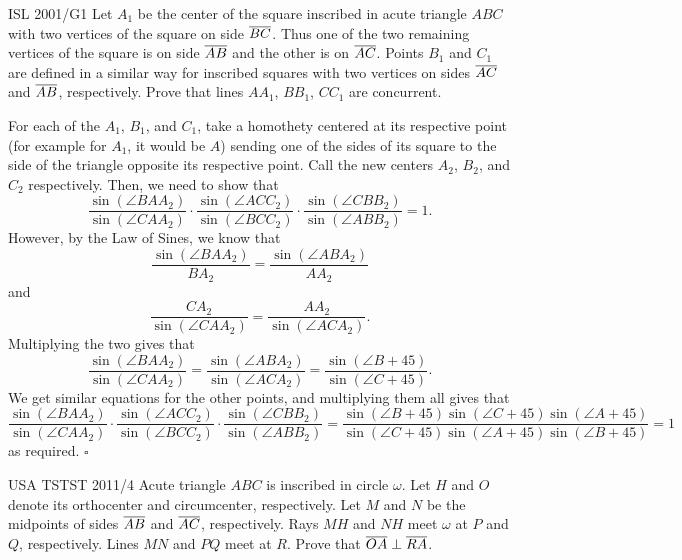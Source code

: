 \documentclass{article}
\begin{document}
\begin{problem}[3.28]{ISL 2001/G1}
Let $A_1$ be the center of the square inscribed in acute triangle $ABC$ with two vertices of the square on side $\overline{BC}$. Thus one of the two remaining vertices of the square is on side $\overline{AB}$ and the other is on $\overline{AC}$. Points $B_1$ and $C_1$ are defined in a similar way for inscribed squares with two vertices on sides $\overline{AC}$ and $\overline{AB}$, respectively. Prove that lines $AA_1$, $BB_1$, $CC_1$ are concurrent.
\end{problem}

For each of the $A_1$, $B_1$, and $C_1$, take a homothety centered at its respective point (for example for $A_1$, it would be $A$) sending one of the sides of its square to the side of the triangle opposite its respective point. Call the new centers $A_2$, $B_2$, and $C_2$ respectively. Then, we need to show that \[\dfrac{\sin(\angle BAA_2)}{\sin(\angle CAA_2)}\cdot\dfrac{\sin(\angle ACC_2)}{\sin(\angle BCC_2)}\cdot\dfrac{\sin(\angle CBB_2)}{\sin(\angle ABB_2)} = 1.\] However, by the Law of Sines, we know that \[\dfrac{\sin(\angle BAA_2)}{BA_2} = \dfrac{\sin(\angle ABA_2)}{AA_2}\] and \[\dfrac{CA_2}{\sin(\angle CAA_2)} = \dfrac{AA_2}{\sin(\angle ACA_2)}.\] Multiplying the two gives that \[\dfrac{\sin(\angle BAA_2)}{\sin(\angle CAA_2)} = \dfrac{\sin(\angle ABA_2)}{\sin(\angle ACA_2)} = \dfrac{\sin(\angle B+45)}{\sin(\angle C+45)}.\] We get similar equations for the other points, and multiplying them all gives that \[\dfrac{\sin(\angle BAA_2)}{\sin(\angle CAA_2)}\cdot\dfrac{\sin(\angle ACC_2)}{\sin(\angle BCC_2)}\cdot\dfrac{\sin(\angle CBB_2)}{\sin(\angle ABB_2)} = \dfrac{\sin(\angle B+45)\sin(\angle C+45)\sin(\angle A+45)}{\sin(\angle C+45)\sin(\angle A+45)\sin(\angle B+45)} = 1\] as required. $\square$

\newpage

\begin{problem}[3.29]{USA TSTST 2011/4}
Acute triangle $ABC$ is inscribed in circle $\omega$. Let $H$ and $O$ denote its orthocenter and circumcenter, respectively. Let $M$ and $N$ be the midpoints of sides $\overline{AB}$ and $\overline{AC}$, respectively. Rays $MH$ and $NH$ meet $\omega$ at $P$ and $Q$, respectively. Lines $MN$ and $PQ$ meet at $R$. Prove that $\overline{OA}\perp \overline{RA}$.
\end{problem}
\end{document}
